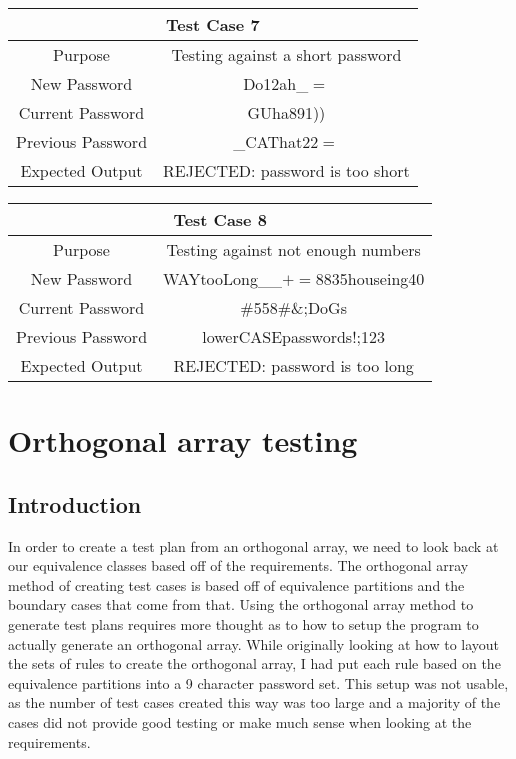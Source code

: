 \documentclass[12pt,letterpaper]{article}
\begin{document}
\vspace{1mm}
\begin{center}
  \begin{tabular}{||c|c||}
  \hline
  \multicolumn{2}{||c||}{Test Case 7} \\
  \hline
  Purpose & Testing against a short password \\
  \hline
  New Password & Do12ah\_$=$ \\
  \hline
  Current Password & GUha891)) \\
  \hline
  Previous Password & \_CAThat22$=$ \\
  \hline
  Expected Output & REJECTED: password is too short \\
  \hline
  \end{tabular}
\end{center}
\vspace{1mm}
\begin{center}
  \begin{tabular}{||c|c||}
  \hline
  \multicolumn{2}{||c||}{Test Case 8} \\
  \hline
  Purpose & Testing against not enough numbers \\
  \hline
  New Password & WAYtooLong\_\_$+$$=$8835houseing40 \\
  \hline
  Current Password & \#558\#\&;DoGs \\
  \hline
  Previous Password & lowerCASEpasswords!;123 \\
  \hline
  Expected Output & REJECTED: password is too long \\
  \hline
  \end{tabular}
\end{center}



\section{Orthogonal array testing}

\subsection{Introduction}

In order to create a test plan from an orthogonal array, we need to look back at our equivalence classes
based off of the requirements. The orthogonal array method of creating test cases is based off of equivalence partitions
and the boundary cases that come from that. Using the orthogonal array method to generate test plans requires more thought
as to how to setup the program to actually generate an orthogonal array. While originally looking at how to layout
the sets of rules to create the orthogonal array, I had put each rule based on the equivalence partitions into
a 9 character password set. This setup was not usable, as the number of test cases created this way was too large
and a majority of the cases did not provide good testing or make much sense when looking at the requirements.
\end{document}
